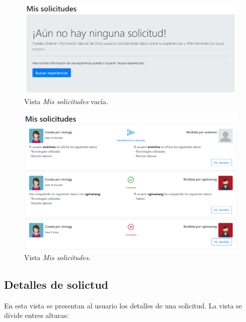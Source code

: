 \documentclass[a4paper, 12pt]{book}
\begin{document}
    \begin{figure}
        \centering
        \includegraphics[width=15cm, keepaspectratio]{img/my_negotiations_empty.PNG}
        \caption{Vista \emph{Mis solicitudes} vacía.}\label{fig:view_my_negotiations_empty}
    \end{figure}

    \begin{figure}
        \centering
        \includegraphics[width=15cm, keepaspectratio]{img/my_negotiations.PNG}
        \caption{Vista \emph{Mis solicitudes}.}\label{fig:view_my_negotiations}
    \end{figure}

    \subsection{Detalles de solictud}
    \label{subsec:view_negotiation_details}
    En esta vista se presentan al usuario los detalles de una solicitud.
    La vista se divide entres alturas:
\end{document}
